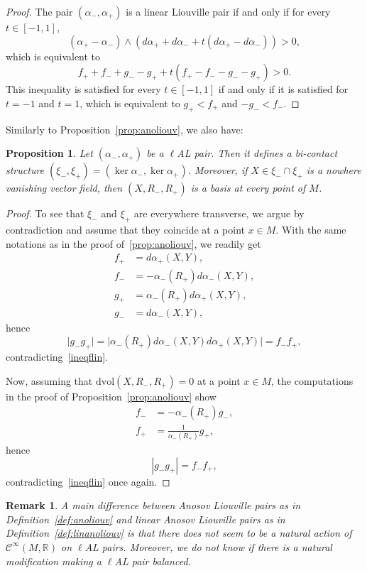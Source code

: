\documentclass[letterpaper, 11pt]{article}
\numberwithin{equation}{section}
\newtheorem{prop}[thm]{Proposition}
\newtheorem{rem}[thm]{Remark}
\newcommand{\R}{\mathbb{R}}
\begin{document}
\begin{proof}
The pair $(\alpha_-, \alpha_+)$ is a linear Liouville pair if and only if for every $t \in [-1, 1]$, $$(\alpha_+ - \alpha_-) \wedge (d\alpha_+ + d\alpha_- + t(d\alpha_+ - d\alpha_-))>0,$$ 
which is equivalent to $$f_+ +f_- + g_- - g_+  + t(f_+ -f_- - g_- - g_+)>0.$$
This inequality is satisfied for every $t \in [-1,1]$ if and only if it is satisfied for $t=-1$ and $t=1$, which is equivalent to $g_+ < f_+$ and $-g_- < f_-$.
\end{proof}

Similarly to Proposition~\ref{prop:anoliouv}, we also have:

\begin{prop} \label{prop:linanoliouv}
Let $(\alpha_-, \alpha_+)$ be a $\ell$AL pair. Then it defines a bi-contact structure $(\xi_-,\xi_+) = (\ker \alpha_-, \ker \alpha_+)$. Moreover, if $X \in \xi_- \cap \xi_+$ is a nowhere vanishing vector field, then $(X, R_-, R_+)$ is a basis at every point of $M$.
\end{prop}

\begin{proof}
To see that $\xi_-$ and $\xi_+$ are everywhere transverse, we argue by contradiction and assume that they coincide at a point $x\in M$. With the same notations as in the proof of~\ref{prop:anoliouv}, we readily get
\begin{align*}
f_+ &=d\alpha_+(X,Y),\\
f_- &=-\alpha_-(R_+) d\alpha_-(X,Y), \\
g_+ &=\alpha_-(R_+) d\alpha_+(X,Y), \\
g_- &=d\alpha_-(X,Y),
\end{align*}
hence $$\vert g_- g_+\vert =\vert \alpha_-(R_+) d\alpha_-(X,Y) d\alpha_+(X,Y) \vert =  f_- f_+,$$
contradicting~\eqref{ineqflin}.

Now, assuming that $\mathrm{dvol}(X,R_-, R_+) = 0$ at a point $x \in M$, the computations in the proof of Proposition~\ref{prop:anoliouv} show
\begin{align*}
f_- &= -\alpha_-(R_+) g_-, \\
f_+ &= \frac{1}{\alpha_-(R_+)} g_+,
\end{align*}
hence $$|g_- g_+| = f_- f_+,$$
contradicting~\eqref{ineqflin} once again.
\end{proof}

\begin{rem}
A main difference between Anosov Liouville pairs as in Definition~\ref{def:anoliouv} and linear Anosov Liouville pairs as in Definition~\ref{def:linanoliouv} is that there does not seem to be a natural action of $\mathcal{C}^\infty(M, \R)$ on $\ell$AL pairs. Moreover, we do not know if there is a natural modification making a $\ell$AL pair balanced.
\end{rem}
\end{document}
